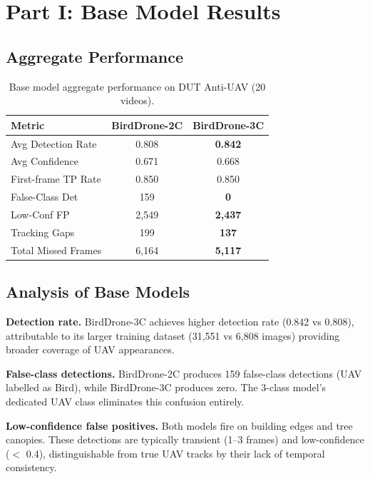 \documentclass[11pt]{article}
\begin{document}
\section{Part I: Base Model Results}

\subsection{Aggregate Performance}

\begin{table}[H]
\centering
\caption{Base model aggregate performance on DUT Anti-UAV (20 videos).}
\label{tab:base}
\begin{tabular}{lcc}
\toprule
\textbf{Metric} & \textbf{BirdDrone-2C} & \textbf{BirdDrone-3C} \\
\midrule
Avg Detection Rate    & 0.808 & \textbf{0.842} \\
Avg Confidence        & 0.671 & 0.668 \\
First-frame TP Rate   & 0.850 & 0.850 \\
False-Class Det       & 159   & \textbf{0} \\
Low-Conf FP           & 2,549 & \textbf{2,437} \\
Tracking Gaps         & 199   & \textbf{137} \\
Total Missed Frames   & 6,164 & \textbf{5,117} \\
\bottomrule
\end{tabular}
\end{table}

\subsection{Analysis of Base Models}

\textbf{Detection rate.}
BirdDrone-3C achieves higher detection rate (0.842 vs 0.808), attributable
to its larger training dataset (31,551 vs 6,808 images) providing broader
coverage of UAV appearances.

\textbf{False-class detections.}
BirdDrone-2C produces 159 false-class detections (UAV labelled as Bird),
while BirdDrone-3C produces zero. The 3-class model's dedicated UAV class
eliminates this confusion entirely.

\textbf{Low-confidence false positives.}
Both models fire on building edges and tree canopies. These detections are
typically transient (1--3 frames) and low-confidence ($<$ 0.4), distinguishable
from true UAV tracks by their lack of temporal consistency.
\end{document}
